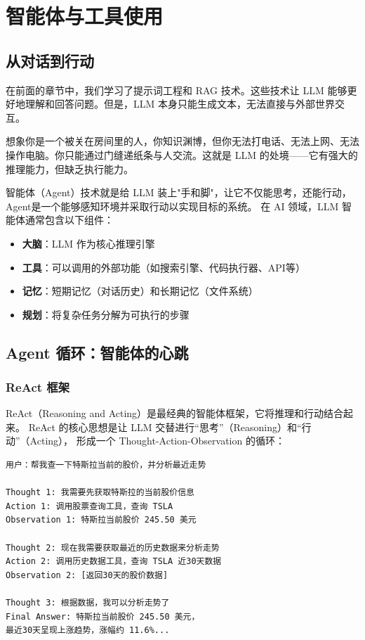 \chapter{智能体与工具使用}
\section{从对话到行动}
在前面的章节中，我们学习了提示词工程和 RAG 技术。这些技术让 LLM 能够更好地理解和回答问题。但是，LLM 本身只能生成文本，无法直接与外部世界交互。

想象你是一个被关在房间里的人，你知识渊博，但你无法打电话、无法上网、无法操作电脑。你只能通过门缝递纸条与人交流。这就是 LLM 的处境——它有强大的推理能力，但缺乏执行能力。

智能体（Agent）技术就是给 LLM 装上"手和脚"，让它不仅能思考，还能行动，Agent是一个能够感知环境并采取行动以实现目标的系统。
在 AI 领域，LLM 智能体通常包含以下组件：

\begin{itemize}
	\item \textbf{大脑}：LLM 作为核心推理引擎
	\item \textbf{工具}：可以调用的外部功能（如搜索引擎、代码执行器、API等）
	\item \textbf{记忆}：短期记忆（对话历史）和长期记忆（文件系统）
	\item \textbf{规划}：将复杂任务分解为可执行的步骤
\end{itemize}

\section{Agent 循环：智能体的心跳}
\subsection{ReAct 框架}
ReAct（Reasoning and Acting）是最经典的智能体框架，它将推理和行动结合起来。
ReAct 的核心思想是让 LLM 交替进行“思考”（Reasoning）和“行动”（Acting），
形成一个 Thought-Action-Observation 的循环：

\begin{verbatim}
用户：帮我查一下特斯拉当前的股价，并分析最近走势

Thought 1: 我需要先获取特斯拉的当前股价信息
Action 1: 调用股票查询工具，查询 TSLA
Observation 1: 特斯拉当前股价 245.50 美元

Thought 2: 现在我需要获取最近的历史数据来分析走势
Action 2: 调用历史数据工具，查询 TSLA 近30天数据
Observation 2: [返回30天的股价数据]

Thought 3: 根据数据，我可以分析走势了
Final Answer: 特斯拉当前股价 245.50 美元，
最近30天呈现上涨趋势，涨幅约 11.6%...
\end{verbatim}

